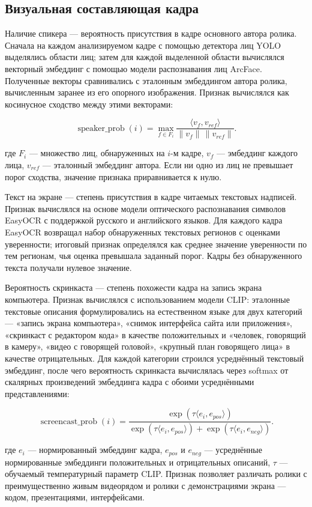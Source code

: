 \documentclass[times]{itmo-student-thesis}
\begin{document}
\subsection{Визуальная составляющая кадра}

Наличие спикера — вероятность присутствия в кадре основного автора ролика. Сначала на каждом анализируемом кадре с помощью детектора лиц YOLO выделялись области лиц; затем для каждой выделенной области вычислялся векторный эмбеддинг с помощью модели распознавания лиц ArcFace. Полученные векторы сравнивались с эталонным эмбеддингом автора ролика, вычисленным заранее из его опорного изображения. Признак вычислялся как косинусное сходство между этими векторами:

\[
\operatorname{speaker\_prob}(i)=\max_{f\in F_i}\frac{\langle v_f,v_{ref}\rangle}{\lVert v_f\rVert\,\lVert v_{ref}\rVert}.
\]

где $F_i$ — множество лиц, обнаруженных на $i$-м кадре, $v_f$ — эмбеддинг каждого лица, $v_{ref}$ — эталонный эмбеддинг автора. Если ни одно из лиц не превышает порог сходства, значение признака приравнивается к нулю.

Текст на экране — степень присутствия в кадре читаемых текстовых надписей. Признак вычислялся на основе модели оптического распознавания символов EasyOCR с поддержкой русского и английского языков. Для каждого кадра EasyOCR возвращал набор обнаруженных текстовых регионов с оценками уверенности; итоговый признак определялся как среднее значение уверенности по тем регионам, чья оценка превышала заданный порог. Кадры без обнаруженного текста получали нулевое значение.

Вероятность скринкаста — степень похожести кадра на запись экрана компьютера. Признак вычислялся с использованием модели CLIP: эталонные текстовые описания формулировались на естественном языке для двух категорий — «запись экрана компьютера», «снимок интерфейса сайта или приложения», «скринкаст с редактором кода» в качестве положительных и «человек, говорящий в камеру», «видео с говорящей головой», «крупный план говорящего лица» в качестве отрицательных. Для каждой категории строился усреднённый текстовый эмбеддинг, после чего вероятность скринкаста вычислялась через softmax от скалярных произведений эмбеддинга кадра с обоими усреднёнными представлениями:

\[
\operatorname{screencast\_prob}(i)=\frac{\exp(\tau\langle e_i,e_{pos}\rangle)}{\exp(\tau\langle e_i,e_{pos}\rangle)+\exp(\tau\langle e_i,e_{neg}\rangle)}.
\]

где $e_i$ — нормированный эмбеддинг кадра, $e_{pos}$ и $e_{neg}$ — усреднённые нормированные эмбеддинги положительных и отрицательных описаний, $\tau$ — обучаемый температурный параметр CLIP. Признак позволяет различать ролики с преимущественно живым видеорядом и ролики с демонстрациями экрана — кодом, презентациями, интерфейсами.
\end{document}
